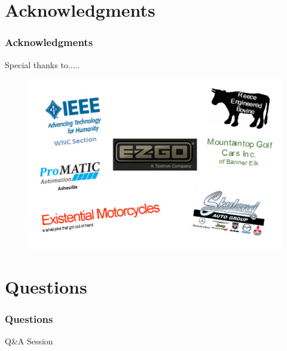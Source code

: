 \documentclass{beamer}
\begin{document}
\section{Acknowledgments}
\begin{frame}
	\frametitle{Acknowledgments}
		\begin{block}{Special thanks to.....}
			\begin{figure}
			\centering
			\includegraphics[scale=.7]{figures/thanks.pdf}
			\end{figure}
		\end{block}
\end{frame}
\section{Questions}
\begin{frame}
	\frametitle{Questions}
		\centering \huge Q\&A Session
\end{frame}

\end{document}
